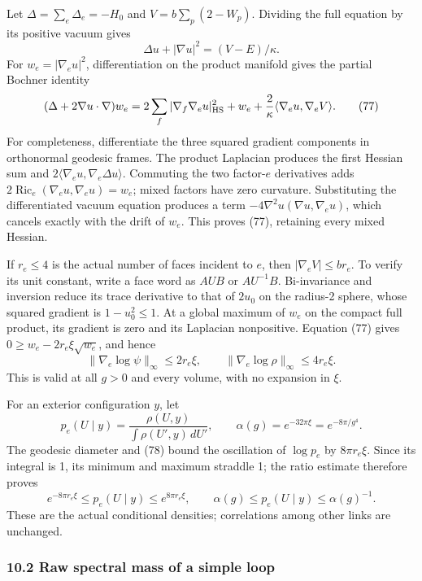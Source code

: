 \documentclass[
  11pt,
]{article}
\begin{document}
Let \(\Delta=\sum_e\Delta_e=-H_0\) and \(V=b\sum_p(2-W_p)\). Dividing
the full equation by its positive vacuum gives \[
 \Delta u+|\nabla u|^2=(V-E)/\kappa .
\] For \(w_e=|\nabla_eu|^2\), differentiation on the product manifold
gives the partial Bochner identity \[
 (\Delta+2\nabla u\cdot\nabla)w_e
 =2\sum_f|\nabla_f\nabla_eu|_{\rm HS}^2+w_e
   +\frac2\kappa\langle\nabla_eu,\nabla_eV\rangle .
 \tag{77}
\] For completeness, differentiate the three squared gradient components
in orthonormal geodesic frames. The product Laplacian produces the first
Hessian sum and \(2\langle\nabla_eu,\nabla_e\Delta u\rangle\). Commuting
the two factor-\(e\) derivatives adds
\(2\operatorname{Ric}_e(\nabla_eu,\nabla_eu)=w_e\); mixed factors have
zero curvature. Substituting the differentiated vacuum equation produces
a term \(-4\nabla^2u(\nabla u,\nabla_eu)\), which cancels exactly with
the drift of \(w_e\). This proves (77), retaining every mixed Hessian.

If \(r_e\le4\) is the actual number of faces incident to \(e\), then
\(|\nabla_eV|\le br_e\). To verify its unit constant, write a face word
as \(AUB\) or \(AU^{-1}B\). Bi-invariance and inversion reduce its trace
derivative to that of \(2u_0\) on the radius-2 sphere, whose squared
gradient is \(1-u_0^2\le1\). At a global maximum of \(w_e\) on the
compact full product, its gradient is zero and its Laplacian
nonpositive. Equation (77) gives \(0\ge w_e-2r_e\xi\sqrt{w_e}\), and
hence \[
 \|\nabla_e\log\psi\|_\infty\le2r_e\xi,\qquad
 \|\nabla_e\log\rho\|_\infty\le4r_e\xi .
 \tag{78}
\] This is valid at all \(g>0\) and every volume, with no expansion in
\(\xi\).

For an exterior configuration \(y\), let \[
 p_e(U\mid y)=\frac{\rho(U,y)}{\int\rho(U',y)\,dU'},\qquad
 \alpha(g)=e^{-32\pi\xi}=e^{-8\pi/g^4}.
\] The geodesic diameter and (78) bound the oscillation of \(\log p_e\)
by \(8\pi r_e\xi\). Since its integral is 1, its minimum and maximum
straddle 1; the ratio estimate therefore proves \[
 e^{-8\pi r_e\xi}\le p_e(U\mid y)
       \le e^{8\pi r_e\xi},\qquad
 \alpha(g)\le p_e(U\mid y)\le\alpha(g)^{-1}.
 \tag{79}
\] These are the actual conditional densities; correlations among other
links are unchanged.

\subsubsection{10.2 Raw spectral mass of a simple
loop}\label{raw-spectral-mass-of-a-simple-loop}
\end{document}
